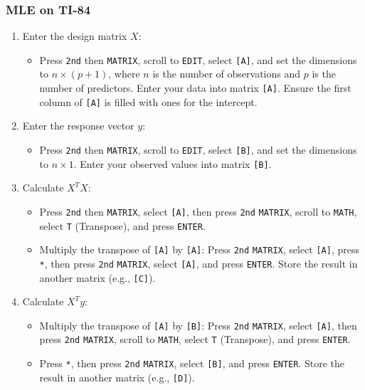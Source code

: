 \documentclass{article}
\newcommand{\code}[1]{\colorbox{light-gray}{\texttt{#1}}}
\begin{document}
\subsubsection{MLE on TI-84}

\begin{enumerate}
    \item Enter the design matrix $X$:
    \begin{itemize}
        \item Press \code{2nd} then \code{MATRIX}, scroll to \code{EDIT}, select \code{[A]}, and set the dimensions to $n \times (p+1)$, where $n$ is the number of observations and $p$ is the number of predictors. Enter your data into matrix \code{[A]}. Ensure the first column of \code{[A]} is filled with ones for the intercept.
    \end{itemize}
    \item Enter the response vector $y$:
    \begin{itemize}
        \item Press \code{2nd} then \code{MATRIX}, scroll to \code{EDIT}, select \code{[B]}, and set the dimensions to $n \times 1$. Enter your observed values into matrix \code{[B]}.
    \end{itemize}
    \item Calculate $X^T X$:
    \begin{itemize}
        \item Press \code{2nd} then \code{MATRIX}, select \code{[A]}, then press \code{2nd} \code{MATRIX}, scroll to \code{MATH}, select \code{T} (Transpose), and press \code{ENTER}.
        \item Multiply the transpose of \code{[A]} by \code{[A]}: Press \code{2nd} \code{MATRIX}, select \code{[A]}, press \code{*}, then press \code{2nd} \code{MATRIX}, select \code{[A]}, and press \code{ENTER}. Store the result in another matrix (e.g., \code{[C]}).
    \end{itemize}
    \item Calculate $X^T y$:
    \begin{itemize}
        \item Multiply the transpose of \code{[A]} by \code{[B]}: Press \code{2nd} \code{MATRIX}, select \code{[A]}, then press \code{2nd} \code{MATRIX}, scroll to \code{MATH}, select \code{T} (Transpose), and press \code{ENTER}.
        \item Press \code{*}, then press \code{2nd} \code{MATRIX}, select \code{[B]}, and press \code{ENTER}. Store the result in another matrix (e.g., \code{[D]}).

\end{itemize}
\end{enumerate}
\end{document}
